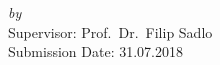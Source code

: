 \begin{titlepage}
  \vspace*{5cm}
  \makeatletter
  \begin{center}
    \begin{Huge}
      \@title
    \end{Huge}\\[1.0cm]
    \begin{Large}
      \@subtitle
    \end{Large}\\
    \emph{by}\\
    \@author
    \vfill
    Supervisor: Prof.\ Dr.\ Filip Sadlo\\
    Submission Date: 31.07.2018
  \end{center}
  \makeatother
\end{titlepage}

\newpage
\null
\thispagestyle{empty}
\newpage
